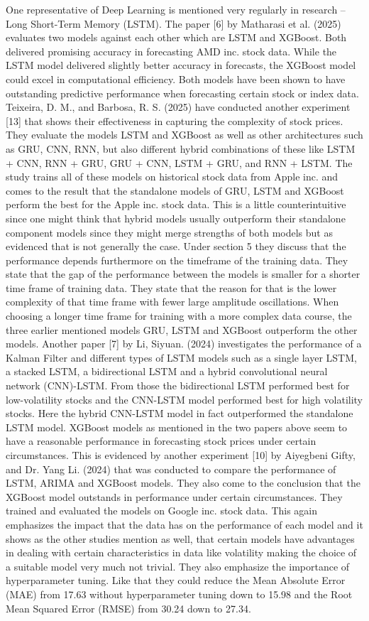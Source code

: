 \documentclass[a4paper,12pt]{report}
\begin{document}
One representative of Deep Learning is mentioned very regularly in research – Long Short-Term Memory (LSTM). The paper [6] by Matharasi et al. (2025) evaluates two models against each other which are LSTM and XGBoost. Both delivered promising accuracy in forecasting AMD inc. stock data. While the LSTM model delivered slightly better accuracy in forecasts, the XGBoost model could excel in computational efficiency. Both models have been shown to have outstanding predictive performance when forecasting certain stock or index data. Teixeira, D. M., and Barbosa, R. S. (2025) have conducted another experiment [13] that shows their effectiveness in capturing the complexity of stock prices. They evaluate the models LSTM and XGBoost as well as other architectures such as GRU, CNN, RNN, but also different hybrid combinations of these like LSTM + CNN, RNN + GRU, GRU + CNN, LSTM + GRU, and RNN + LSTM. The study trains all of these models on historical stock data from Apple inc. and comes to the result that the standalone models of GRU, LSTM and XGBoost perform the best for the Apple inc. stock data. This is a little counterintuitive since one might think that hybrid models usually outperform their standalone component models since they might merge strengths of both models but as evidenced that is not generally the case. Under section 5 they discuss that the performance depends furthermore on the timeframe of the training data. They state that the gap of the performance between the models is smaller for a shorter time frame of training data. They state that the reason for that is the lower complexity of that time frame with fewer large amplitude oscillations. When choosing a longer time frame for training with a more complex data course, the three earlier mentioned models GRU, LSTM and XGBoost outperform the other models. Another paper [7] by Li, Siyuan. (2024) investigates the performance of a Kalman Filter and different types of LSTM models such as a single layer LSTM, a stacked LSTM, a bidirectional LSTM and a hybrid convolutional neural network (CNN)-LSTM. From those the bidirectional LSTM performed best for low-volatility stocks and the CNN-LSTM model performed best for high volatility stocks. Here the hybrid CNN-LSTM model in fact outperformed the standalone LSTM model. XGBoost models as mentioned in the two papers above seem to have a reasonable performance in forecasting stock prices under certain circumstances. This is evidenced by another experiment [10] by Aiyegbeni Gifty, and Dr. Yang Li. (2024) that was conducted to compare the performance of LSTM, ARIMA and XGBoost models. They also come to the conclusion that the XGBoost model outstands in performance under certain circumstances. They trained and evaluated the models on Google inc. stock data. This again emphasizes the impact that the data has on the performance of each model and it shows as the other studies mention as well, that certain models have advantages in dealing with certain characteristics in data like volatility making the choice of a suitable model very much not trivial. They also emphasize the importance of hyperparameter tuning. Like that they could reduce the Mean Absolute Error (MAE) from 17.63 without hyperparameter tuning down to 15.98 and the Root Mean Squared Error (RMSE) from 30.24 down to 27.34.
\end{document}
